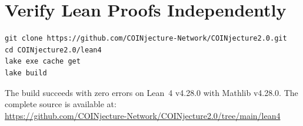 \documentclass[12pt,letterpaper]{article}
\begin{document}
\section{Verify Lean Proofs Independently}

\begin{verbatim}
git clone https://github.com/COINjecture-Network/COINjecture2.0.git
cd COINjecture2.0/lean4
lake exe cache get
lake build
\end{verbatim}

The build succeeds with zero errors on Lean~4 v4.28.0 with Mathlib v4.28.0. The complete source is
available at:\\
\url{https://github.com/COINjecture-Network/COINjecture2.0/tree/main/lean4}
\end{document}
